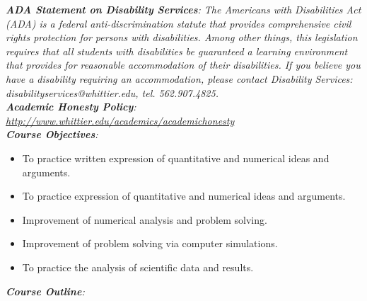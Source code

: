 \documentclass[10pt]{article}
\begin{document}
\textit{\textbf{ADA Statement on Disability Services}: The Americans with Disabilities Act (ADA) is a federal anti-discrimination statute that provides comprehensive civil rights protection for persons with disabilities. Among other things, this legislation requires that all students with disabilities be guaranteed a learning environment that provides for reasonable accommodation of their disabilities. If you believe you have a disability requiring an accommodation, please contact Disability Services: disabilityservices@whittier.edu, tel. 562.907.4825.} \\
\textit{\textbf{Academic Honesty Policy}: \url{http://www.whittier.edu/academics/academichonesty}} \\
\textit{\textbf{Course Objectives}:}
\begin{itemize}
\item To practice written expression of quantitative and numerical ideas and arguments.
\item To practice expression of quantitative and numerical ideas and arguments.
\item Improvement of numerical analysis and problem solving.
\item Improvement of problem solving via computer simulations.
\item To practice the analysis of scientific data and results.
\\
\end{itemize}
\textit{\textbf{Course Outline}:}
\end{document}
